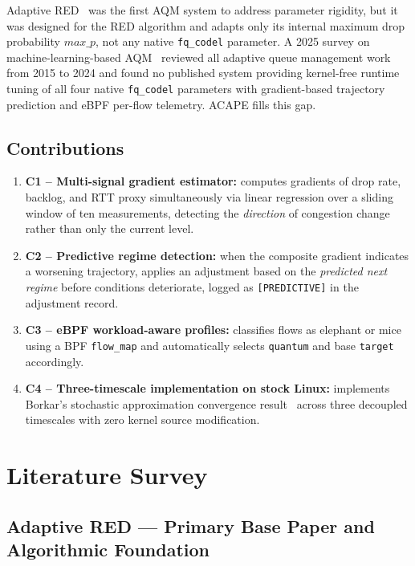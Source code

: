 \documentclass[conference]{IEEEtran}
\begin{document}
Adaptive RED~\cite{ared2001} was the first AQM system to address parameter
rigidity, but it was designed for the RED algorithm and adapts only its internal
maximum drop probability $\mathit{max\_p}$, not any native \texttt{fq\_codel}
parameter. A 2025 survey on machine-learning-based AQM~\cite{mallick2025}
reviewed all adaptive queue management work from 2015 to 2024 and found no
published system providing kernel-free runtime tuning of all four native
\texttt{fq\_codel} parameters with gradient-based trajectory prediction and
eBPF per-flow telemetry. ACAPE fills this gap.

\subsection{Contributions}

\begin{enumerate}
\item \textbf{C1 -- Multi-signal gradient estimator:} computes gradients of
drop rate, backlog, and RTT proxy simultaneously via linear regression over a
sliding window of ten measurements, detecting the \emph{direction} of
congestion change rather than only the current level.
\item \textbf{C2 -- Predictive regime detection:} when the composite gradient
indicates a worsening trajectory, applies an adjustment based on the
\emph{predicted next regime} before conditions deteriorate, logged as
\texttt{[PREDICTIVE]} in the adjustment record.
\item \textbf{C3 -- eBPF workload-aware profiles:} classifies flows as elephant
or mice using a BPF \texttt{flow\_map} and automatically selects \texttt{quantum}
and base \texttt{target} accordingly.
\item \textbf{C4 -- Three-timescale implementation on stock Linux:} implements
Borkar's stochastic approximation convergence result~\cite{borkar1997} across
three decoupled timescales with zero kernel source modification.
\end{enumerate}

\section{Literature Survey}

\subsection{Adaptive RED --- Primary Base Paper and Algorithmic Foundation}
\end{document}
